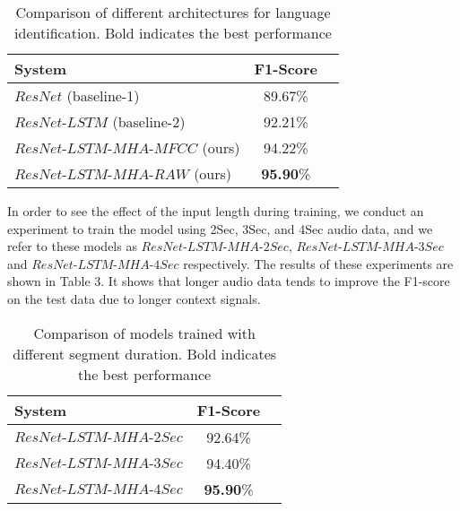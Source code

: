\documentclass{article}
\begin{document}
\begin{table}[!htbp]
  \centering
  \label{tab:tasks}
  \begin{adjustbox}{max width=\textwidth}
    \begin{tabular}{lcc}
      \toprule
      \textbf{System} & \textbf{F1-Score}\\
      \midrule
      $\textit{ResNet}$ (baseline-1) & 89.67\%\\
      $\textit{ResNet-LSTM}$ (baseline-2) & 92.21\%\\
      $\textit{ResNet-LSTM-MHA-MFCC}$ (ours) & 94.22\%\\
      $\textit{ResNet-LSTM-MHA-RAW}$ (ours) & \textbf{95.90}\%\\
      
      \bottomrule
    \end{tabular}
  \end{adjustbox}
  \caption{Comparison of different architectures for language identification. Bold indicates 
  the best performance}
\end{table}

In order to see the effect of the input length during training, we conduct an experiment to train the model using 2Sec, 3Sec, and 4Sec audio data, and we refer to these models as $\textit{ResNet-LSTM-MHA-2Sec}$, $\textit{ResNet-LSTM-MHA-3Sec}$ and $\textit{ResNet-LSTM-MHA-4Sec}$ respectively. The results of these experiments are shown in Table 3. It shows that longer audio data tends to improve the F1-score on the test data due to longer context signals.

\begin{table}[!htbp]
  \centering
  \caption{Comparison of models trained with different segment duration. Bold indicates 
  the best performance}
  \label{tab:tasks}
  \begin{adjustbox}{max width=\textwidth}
    \begin{tabular}{lcc}
      \toprule
      \textbf{System} & \textbf{F1-Score}\\
      \midrule
      $\textit{ResNet-LSTM-MHA-2Sec}$  & 92.64\%\\
      $\textit{ResNet-LSTM-MHA-3Sec}$ & 94.40\%\\
      $\textit{ResNet-LSTM-MHA-4Sec}$ & \textbf{95.90}\%\\
      \bottomrule
    \end{tabular}
  \end{adjustbox}
\end{table}
\end{document}
